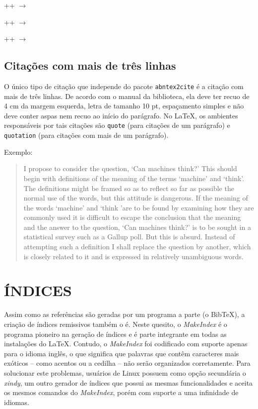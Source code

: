 \documentclass[xindy,rascunho]{fei}
\begin{document}
\begin{teorema}
	\latexinline++ \(\to\) 

	\latexinline++ \(\to\) 

	\latexinline++ \(\to\) 
	
	\section{Citações com mais de três linhas}
	
	O único tipo de citação que independe do pacote \texttt{abntex2cite} é a citação com mais de três linhas. De acordo com o manual da biblioteca, ela deve ter recuo de 4 cm da margem esquerda, letra de tamanho 10 pt, espaçamento simples e não deve conter aspas nem recuo ao início do parágrafo. No \LaTeX, os ambientes responsáveis por tais citações são \texttt{quote} (para citações de um parágrafo) e \texttt{quotation} (para citações com mais de um parágrafo).
	
	Exemplo:
	
	\begin{quote}		
	I propose to consider the question, `Can machines think?' This should begin with definitions of the meaning of the terms `machine' and `think'. The definitions might be framed so as to reflect so far as possible the normal use of the words, but this attitude is dangerous. If the meaning of the words `machine' and `think 'are to be found by examining how they are commonly used it is difficult to escape the conclusion that the meaning and the answer to the question, `Can machines think?' is to be sought in a statistical survey such as a Gallup poll. But this is absurd. Instead of attempting such a definition I shall replace the question by another, which is closely related to it and is expressed in relatively unambiguous words. \cite{j:turing50}
	\end{quote}

	\chapter{ÍNDICES}\label{chap:indice}
	
	Assim como as referências são geradas por um programa a parte (o Bib\TeX), a criação de índices remissivos também o é. Neste quesito, o \emph{MakeIndex} é o programa pioneiro na geração de índices e é parte integrante em todas as instalações do \LaTeX. Contudo, o \emph{MakeIndex} foi codificado com suporte apenas para o idioma inglês, o que significa que palavras que contêm caracteres mais exóticos -- como acentos ou a cedilha -- não serão organizados corretamente. Para solucionar este problemas, usuários de Linux possuem como opção secundária o \emph{xindy}, um outro gerador de índices que possui as mesmas funcionalidades e aceita os mesmos comandos do \emph{MakeIndex}, porém com suporte a uma infinidade de idiomas.
	

\end{teorema}
\end{document}
